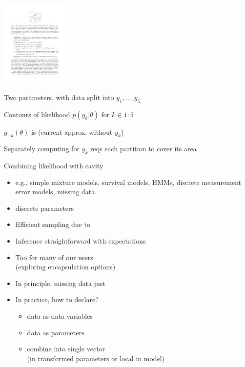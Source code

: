\documentclass[10pt]{report}
\begin{document}
%
\vspace*{-6pt}
\begin{center}
\includegraphics[width=0.25\textwidth]{img/ep-cavity.pdf}
\end{center}
\vspace*{-8pt}
\begin{subitemize}
\item Two parameters, with data split into $y_1, \ldots, y_5$
\item Contours of likelihood $p(y_k | \theta)$ for $k \in 1{:}5$
\item $g_{-k}(\theta)$ is  (current
  approx. without $y_k$)
\item Separately computing for $y_k$ reqs each partition to cover its area
\item Combining likelihood with cavity 
\end{subitemize}




%
\begin{itemize}
\item e.g., simple mixture models, survival models, HMMs,
  discrete measurement error models, missing data
\item {} discrete parameters
\item Efficient sampling due to 
\item Inference straightforward with expectations
  \vspace*{12pt}
\item Too  for many of our users
  \\
  {\small (exploring encapsulation options)}
\end{itemize}


%
\begin{itemize}
\item In principle, missing data just 
\item In practice, how to declare? 
  \begin{itemize}
  \item {} data as data variables
  \item {} data as parameters
  \item combine into single vector 
    \\ {\footnotesize (in transformed parameters or local in model)}
  \end{itemize}
\end{itemize}
\end{document}
